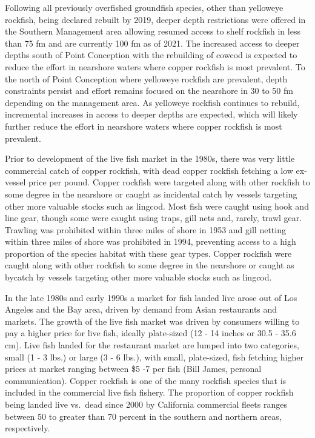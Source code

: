 \documentclass[11pt,
  english,
  a4paper,
]{article}
\begin{document}
\leavevmode\tagmcend\tagstructend\par


Following all previously overfished groundfish species, other than yelloweye rockfish, being declared rebuilt by 2019, deeper depth restrictions were offered in the Southern Management area allowing resumed access to shelf rockfish in less than 75 fm and are currently 100 fm as of 2021. The increased access to deeper depths south of Point Conception with the rebuilding of cowcod is expected to reduce the effort in nearshore waters where copper rockfish is most prevalent. To the north of Point Conception where yelloweye rockfish are prevalent, depth constraints persist and effort remains focused on the nearshore in 30 to 50 fm depending on the management area. As yelloweye rockfish continues to rebuild, incremental increases in access to deeper depths are expected, which will likely further reduce the effort in nearshore waters where copper rockfish is most prevalent.

\leavevmode\tagmcend\tagstructend\par


Prior to development of the live fish market in the 1980s, there was very little commercial catch of copper rockfish, with dead copper rockfish fetching a low ex-vessel price per pound. Copper rockfish were targeted along with other rockfish to some degree in the nearshore or caught as incidental catch by vessels targeting other more valuable stocks such as lingcod. Most fish were caught using hook and line gear, though some were caught using traps, gill nets and, rarely, trawl gear. Trawling was prohibited within three miles of shore in 1953 and gill netting within three miles of shore was prohibited in 1994, preventing access to a high proportion of the species habitat with these gear types. Copper rockfish were caught along with other rockfish to some degree in the nearshore or caught as bycatch by vessels targeting other more valuable stocks such as lingcod.

\leavevmode\tagmcend\tagstructend\par


In the late 1980s and early 1990s a market for fish landed live arose out of Los Angeles and the Bay area, driven by demand from Asian restaurants and markets. The growth of the live fish market was driven by consumers willing to pay a higher price for live fish, ideally plate-sized (12 - 14 inches or 30.5 - 35.6 cm). Live fish landed for the restaurant market are lumped into two categories, small (1 - 3 lbs.) or large (3 - 6 lbs.), with small, plate-sized, fish fetching higher prices at market ranging between \$5 -7 per fish (Bill James, personal communication). Copper rockfish is one of the many rockfish species that is included in the commercial live fish fishery. The proportion of copper rockfish being landed live vs.~dead since 2000 by California commercial fleets ranges between 50 to greater than 70 percent in the southern and northern areas, respectively.
\end{document}
